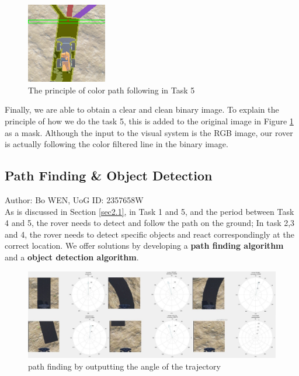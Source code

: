 \begin{figure}[htbp]
    \centering
    \includegraphics[width=3.5cm]{implementation/img_shu/task5_1.png}
    \caption{The principle of color path following in Task 5}
    \label{fig:task5}
\end{figure}

Finally, we are able to obtain a clear and clean binary image. To explain the principle of how we do the task 5, this is added to the original image in Figure \ref{fig:task5} as a mask. Although the input to the visual system is the RGB image, our rover is  actually following the color filtered line in the binary image.
\subsection{Path Finding \& Object Detection}
Author: Bo WEN, UoG ID: 2357658W\\

As is discussed in Section \ref{sec2.1}, in Task 1 and 5, and the period between Task 4 and 5, the rover needs to detect and follow the path on the ground; In task 2,3 and 4, the rover needs to detect specific objects and react correspondingly at the correct location. We offer solutions by developing a \textbf{path finding algorithm} and a \textbf{object detection algorithm}.

\begin{figure}[htbp]
    \centering
    \includegraphics[width=14cm]{implementation/img_wen/path_finding.jpg}
    \caption{path finding by outputting the angle of the trajectory}
    \label{fig:path}
\end{figure}

